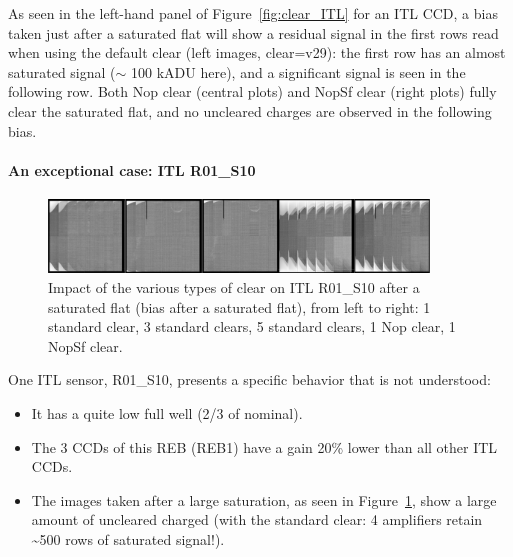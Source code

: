 As seen in the left-hand panel of Figure~\ref{fig:clear_ITL}
for an ITL CCD, a bias taken just after a saturated flat will show a
residual signal in the first rows read when using the default clear
(left images, clear=v29): the first row has an almost saturated signal
($\sim$ 100 kADU here), and a significant signal is seen in
the following row. Both Nop clear (central plots) and NopSf clear
(right plots) fully clear the saturated flat, and no uncleared charges
are observed in the following bias.

\paragraph{An exceptional case: ITL R01\_S10}\label{results-on-itl-r01s10}

\begin{figure}[ht]
\begin{centering}
\includegraphics[width=0.9\textwidth]{figures/Clear_R01_S10.png}
\end{centering}
\caption{Impact of the various types of clear on ITL
R01\_S10 after a saturated flat (bias after a saturated flat), from left
to right: 1 standard clear, 3 standard clears, 5 standard clears, 1 Nop
clear, 1 NopSf clear.}
\label{fig:clears_R01_S10}
\end{figure}


One ITL sensor, R01\_S10,
presents a specific behavior that is not understood:

\begin{itemize}
\tightlist
\item
  It has a quite low full well (2/3 of nominal).
\item
  The 3 CCDs of this REB (REB1) have a gain 20\% lower than all other ITL CCDs.
\item
  The images taken after a large saturation, as seen in Figure~\ref{fig:clears_R01_S10},
  show a large amount of uncleared charged (with the standard clear: 4
  amplifiers retain \textasciitilde500 rows of saturated signal!).
\end{itemize}

